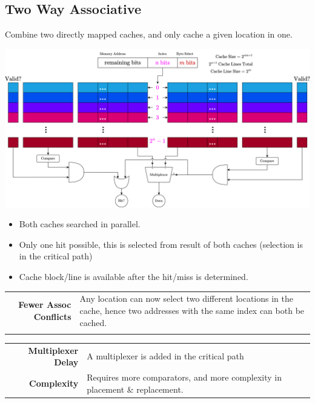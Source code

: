 \subsection{Two Way Associative}
Combine two directly mapped caches, and only cache a given location in one.
\begin{center}
    \includegraphics[width=.9\textwidth]{caches/images/two_way_set_associative.drawio.png}
\end{center}
\begin{itemize}
    \item Both caches searched in parallel.
    \item Only one hit possible, this is selected from result of both caches (selection is in the critical path)
    \item Cache block/line is available after the hit/miss is determined.
\end{itemize}

\begin{prosbox}
    \begin{center}
        \begin{tabular}{r p{}}
            \textbf{Fewer Assoc Conflicts} & Any location can now select two different locations in the cache, hence two addresses with the same index can both be cached. \\
            \textbf{}
        \end{tabular}
    \end{center}
\end{prosbox}
\begin{consbox}
    \begin{center}
        \begin{tabular}{r p{}}
            \textbf{Multiplexer Delay} & A multiplexer is added in the critical path \\
            \textbf{Complexity} & Requires more comparators, and more complexity in placement \& replacement. \\
        \end{tabular}
    \end{center}
\end{consbox}

